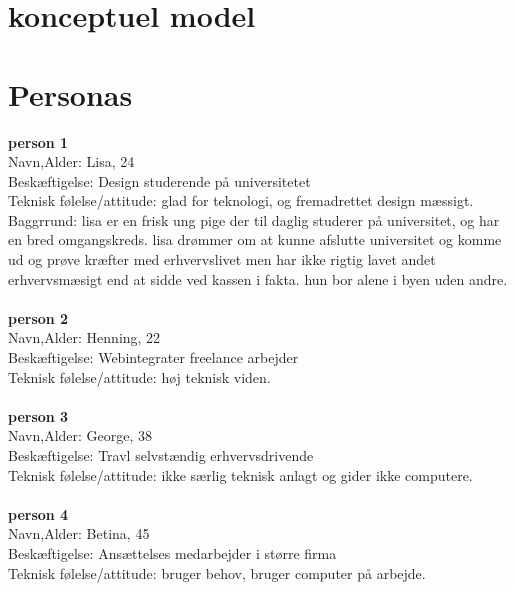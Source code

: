 \documentclass[a4paper,titlepage,fleqn,12pt]{article}
\begin{document}
\section{konceptuel model}
\section{Personas}
\textbf{person 1}\\
Navn,Alder: Lisa, 24\\
Beskæftigelse:	Design studerende på universitetet\\
Teknisk følelse/attitude: glad for teknologi, og fremadrettet design mæssigt.\\
Baggrrund: lisa er en frisk ung pige der til daglig studerer på universitet, og har en bred omgangskreds. lisa drømmer om at kunne afslutte universitet og komme ud og prøve kræfter med erhvervslivet men har ikke rigtig lavet andet erhvervsmæsigt end at sidde ved kassen i fakta. hun bor alene i byen uden andre. 
\\\\
\textbf{person 2}\\
Navn,Alder: Henning, 22\\
Beskæftigelse: Webintegrater freelance arbejder \\
Teknisk følelse/attitude: høj teknisk viden.
\\\\
\textbf{person 3}\\
Navn,Alder: George, 38\\
Beskæftigelse: Travl selvstændig erhvervsdrivende\\
Teknisk følelse/attitude: ikke særlig teknisk anlagt og gider ikke computere.
\\\\
\textbf{person 4}\\
Navn,Alder: Betina, 45\\
Beskæftigelse: Ansættelses medarbejder i større firma\\
Teknisk følelse/attitude: bruger behov, bruger computer på arbejde.
\\\\
\end{document}
